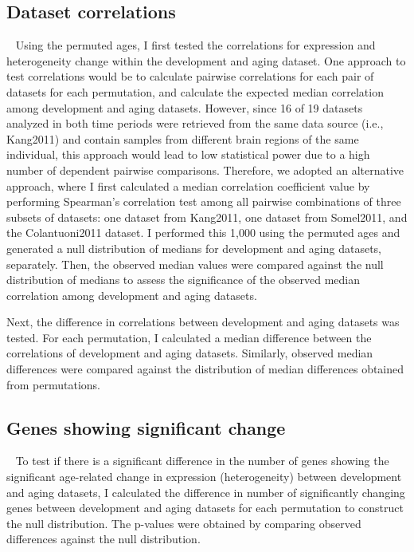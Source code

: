 \subsection{Dataset correlations}~\label{subsec:perm.corr}
Using the permuted ages, I first tested the correlations for expression and heterogeneity change within the development and aging dataset.
One approach to test correlations would be to calculate pairwise correlations for each pair of datasets for each permutation,
and calculate the expected median correlation among development and aging datasets.
However, since 16 of 19 datasets analyzed in both time periods were retrieved from the same data source (i.e., Kang2011) and contain samples from different brain regions of the same individual,
this approach would lead to low statistical power due to a high number of dependent pairwise comparisons.
Therefore, we adopted an alternative approach, where I first calculated a median correlation coefficient value
by performing Spearman's correlation test among all pairwise combinations of three subsets of datasets: one dataset from Kang2011, one dataset from Somel2011, and the Colantuoni2011 dataset.
I performed this 1,000 using the permuted ages and generated a null distribution of medians for development and aging datasets, separately. 
Then, the observed median values were compared against the null distribution of medians to assess the significance of the observed median correlation among development and aging datasets.

Next, the difference in correlations between development and aging datasets was tested. 
For each permutation, I calculated a median difference between the correlations of development and aging datasets.
Similarly, observed median differences were compared against the distribution of median differences obtained from permutations.

\subsection{Genes showing significant change}~\label{subsec:perm.sig.change}
To test if there is a significant difference in the number of genes showing the significant age-related change in expression (heterogeneity) between development and aging datasets,
I calculated the difference in number of significantly changing genes between development and aging datasets for each permutation to construct the null distribution.
The p-values were obtained by comparing observed differences against the null distribution.

